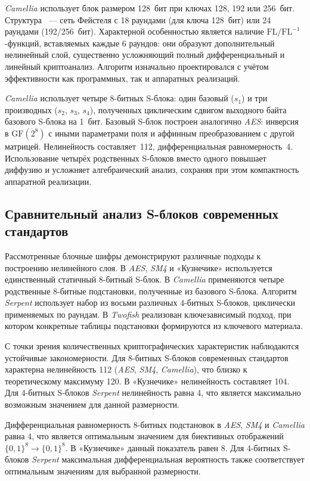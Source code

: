\textit{Camellia }использует блок размером 128~бит при ключах 128, 192 или 256~бит.
Структура~ — сеть Фейстеля с 18 раундами (для ключа 128~бит) или 24 раундами
(192/256~бит). Характерной особенностью является наличие
$\mathrm{FL}/\mathrm{FL}^{-1}$-функций, вставляемых каждые 6 раундов:
они образуют дополнительный нелинейный слой, существенно усложняющий полный
дифференциальный и линейный криптоанализ. Алгоритм изначально проектировался
с учётом эффективности как программных, так и аппаратных реализаций.


\textit{Camellia} использует четыре 8-битных S-блока: один базовый ($s_1$) и три
производных ($s_2$, $s_3$, $s_4$), полученных циклическим сдвигом выходного
байта базового S-блока на 1~бит. Базовый S-блок построен аналогично \textit{AES}:
инверсия в $\mathrm{GF}(2^8)$ с иными параметрами поля и аффинным
преобразованием с другой матрицей. Нелинейность составляет~112,
дифференциальная равномерность~4. Использование четырёх родственных
S-блоков вместо одного повышает диффузию и усложняет алгебраический анализ,
сохраняя при этом компактность аппаратной реализации.

\subsection{Сравнительный анализ S-блоков современных стандартов}
Рассмотренные блочные шифры демонстрируют различные подходы к построению
нелинейного слоя. В \textit{AES}, \textit{SM4} и «Кузнечике» используется
единственный статичный 8-битный S-блок. В \textit{Camellia} применяются
четыре родственные 8-битные подстановки, полученные из базового S-блока.
Алгоритм \textit{Serpent} использует набор из восьми различных 4-битных
S-блоков, циклически применяемых по раундам. В \textit{Twofish} реализован
ключезависимый подход, при котором конкретные таблицы подстановки
формируются из ключевого материала.

С точки зрения количественных криптографических характеристик
наблюдаются устойчивые закономерности. Для 8-битных S-блоков
современных стандартов характерна нелинейность 112
(\textit{AES}, \textit{SM4}, \textit{Camellia}), что близко к
теоретическому максимуму 120. В «Кузнечике» нелинейность составляет 104.
Для 4-битных S-блоков \textit{Serpent} нелинейность равна 4,
что является максимально возможным значением для данной размерности.

Дифференциальная равномерность 8-битных подстановок в \textit{AES},
\textit{SM4} и \textit{Camellia} равна 4, что является оптимальным
значением для биективных отображений $\{0,1\}^8 \to \{0,1\}^8$.
В «Кузнечике» данный показатель равен 8. Для 4-битных S-блоков
\textit{Serpent} максимальная дифференциальная вероятность также
соответствует оптимальным значениям для выбранной размерности.

